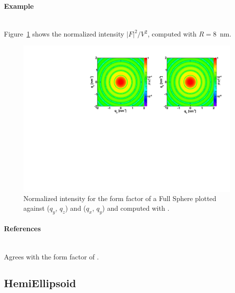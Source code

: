 \paragraph{Example}\strut\\
Figure~\ref{fig:FFfSphereEx} shows the normalized intensity $|F|^2/V^2$, computed with $R=8$~nm.
\begin{figure}[h]
\begin{center}
\includegraphics[angle=-90,width=\textwidth]{fig/ff/figfffsphere.pdf}
\end{center}
\caption{Normalized intensity for the
  form factor of a Full Sphere plotted against ($q_y$, $q_z$) and ($q_x$, $q_y$) and computed with .}
\label{fig:FFfSphereEx}
\end{figure}

\paragraph{References}\strut\\
Agrees with the  form factor of \IsGISAXS
\cite[Eq.~2.36]{Laz08} \cite[Eq.~226]{ReLL09}.

\clearpage
\subsection{HemiEllipsoid} \label{sec:HemiEllipsoid}  

